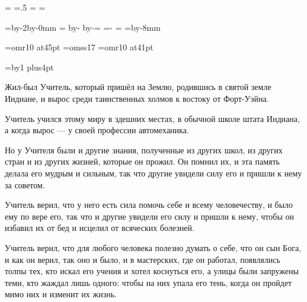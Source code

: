 \pdfpagewidth=297mm
\pdfpageheight=210mm
\pdfhorigin=1in
\pdfvorigin=0pt

\shhtotal=\pdfpagewidth
\htotal=.5\shhtotal
\vtotal=\pdfpageheight
\shoutline=0pt
\shstaplewidth=0pt
\shcrop=0pt
\shfootline={}
\shthickness=0pt

\horigin=4.5mm %
\hsize=\htotal \advance\hsize by-2\horigin \advance\hsize by-0mm %
=\htotal \advance{} by-\hsize \advance{} by-\horigin \horigin=
\hoffset=\htotal \advance\hoffset-\hsize \advance{}\horigin
\output={\ifodd\pageno\hoffset=0pt\fi \plainoutput}
\vorigin=2.5mm
\vsize=\vtotal \advance\vsize by-8mm

\font\chapfont=omr10 at45pt
\font\handfont=omss17
\font\bukvfont=omr10 at41pt

\nopagenumbers

{}
\vskip3cm

\begingroup
\baselineskip=17pt
\newcount\n
\everypar={\advance\n by1 \hang}
\parskip=30pt plus4pt
\handfont

Жил-был Учитель, который пришёл на Землю, родившись в святой земле Индиане, и вырос среди таинственных холмов к востоку от Форт-Уэйна.

Учитель учился этому миру в здешних местах, в обычной школе штата Индиана, а когда вырос --- у своей профессии автомеханика.

Но у Учителя были и другие знания, полученные из других школ, из других стран и из других жизней, которые он прожил. Он помнил их, и эта память делала его мудрым и сильным, так что другие увидели силу его и пришли к нему за советом.

Учитель верил, что у него есть сила помочь себе и всему человечеству, и было ему по вере его, так что и другие увидели его силу и пришли к нему, чтобы он избавил их от бед и исцелил от всяческих болезней.

Учитель верил, что для любого человека полезно думать о себе, что он сын Бога, и как он верил, так оно и было, и в мастерских, где он работал, появлялись толпы тех, кто искал его учения и хотел коснуться его, а улицы были запружены теми, кто жаждал лишь одного: чтобы на них упала его тень, когда он пройдет мимо них и изменит их жизнь.

